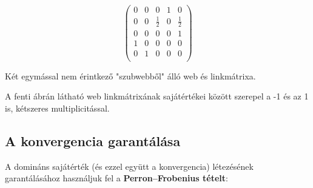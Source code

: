 \documentclass[12pt,a4paper]{article}
\begin{document}
\vspace{0.3cm}
\begin{minipage}{0.4\textwidth}
	\begin{center}
	\end{center}
\end{minipage}
\begin{minipage}{0.5\textwidth}
	\begin{center}
		\[
		\begin{pmatrix}
		0 & 0 & 0 & 1 & 0 \\
		0 & 0 & \frac{1}{2} & 0 & \frac{1}{2} \\
		0 & 0 & 0 & 0 & 1 \\
		1 & 0 & 0 & 0 & 0 \\
		0 & 1 & 0 & 0 & 0 \\
		\end{pmatrix}
		\]
	\end{center}
\end{minipage}
\vspace{0.3cm}
\newline
\centerline{Két egymással nem érintkező "szubwebből" álló web és linkmátrixa.}
\vspace{0.3cm}

A fenti ábrán látható web linkmátrixának sajátértékei között szerepel a -1 és az 1 is, kétszeres multiplicitással.

\subsection{A konvergencia garantálása}\label{konvergencia_garantalas}

A domináns sajátérték (és ezzel együtt a konvergencia) létezésének garantálásához használjuk fel a \textbf{Perron–Frobenius tételt}:
\end{document}
